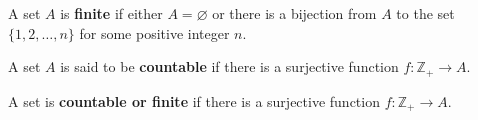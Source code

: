 A set $A$ is \textbf{finite} if either $A = \varnothing$ or there is a bijection from $A$ to the set $\{1, 2, \ldots, n\}$ for some positive integer $n$.

A set $A$ is said to be \textbf{countable} if there is a surjective function $f: \mathbb{Z}_+ \to A$.

A set is \textbf{countable or finite} if there is a surjective function $f: \mathbb{Z}_+ \to A$.
